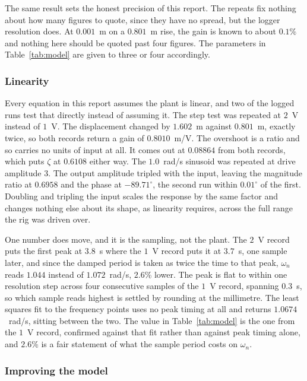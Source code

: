 The same result sets the honest precision of this report. The repeats fix nothing about how
many figures to quote, since they have no spread, but the logger resolution does. At
$0.001$~m on a $0.801$~m rise, the gain is known to about $0.1$\% and nothing here should be
quoted past four figures. The parameters in Table~\ref{tab:model} are given to three or four
accordingly.

\subsubsection*{Linearity}

Every equation in this report assumes the plant is linear, and two of the logged runs test that
directly instead of assuming it. The step test was repeated at $2$~V instead of $1$~V. The
displacement changed by $1.602$~m against $0.801$~m, exactly twice, so both records return a
gain of $0.8010$~m/V. The overshoot is a ratio and so carries no units of input at all. It
comes out at $0.08864$ from both records, which puts $\zeta$ at $0.6108$ either way. The
$1.0$~rad/s sinusoid was repeated at drive amplitude $3$. The output amplitude tripled with the
input, leaving the magnitude ratio at $0.6958$ and the phase at $-89.71^\circ$, the second run
within $0.01^\circ$ of the first. Doubling and tripling the input scales the response by the
same factor and changes nothing else about its shape, as linearity requires, across the full
range the rig was driven over.

One number does move, and it is the sampling, not the plant. The $2$~V record puts
the first peak at $3.8$~s where the $1$~V record puts it at $3.7$~s, one sample later, and
since the damped period is taken as twice the time to that peak, $\omega_n$ reads $1.044$
instead of $1.072$~rad/s, $2.6$\% lower. The peak is flat to within one resolution step
across four consecutive samples of the $1$~V record, spanning $0.3$~s, so which sample reads
highest is settled by rounding at the millimetre. The least squares fit to the frequency
points uses no peak timing at all and returns $1.0674$~rad/s, sitting between the two. The
value in Table~\ref{tab:model} is the one from the $1$~V record, confirmed against that fit
rather than against peak timing alone, and $2.6$\% is a fair statement of what the sample
period costs on $\omega_n$.

\subsubsection*{Improving the model}

